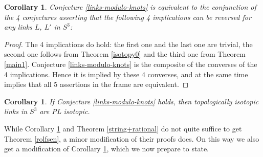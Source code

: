 \documentclass[a4paper,12pt,reqno,oneside]{amsart} %
\theoremstyle{plain}
\newtheorem{corollary}[theorem]{Corollary}
\theoremstyle{definition}
\theoremstyle{named}
\renewcommand{\:}{\colon}
\begin{document}
\begin{corollary} \label{main1'} Conjecture \ref{links-modulo-knots} is equivalent to the conjunction of the 4 conjectures 
asserting that the following 4 implications can be reversed for any links $L$, $L'$ in $S^3$:
\bigskip

\noindent{}
\end{corollary}

\begin{proof} The 4 implications do hold: the first one and the last one are trivial, the second one follows from 
Theorem \ref{isotopy0} and the third one from Theorem \ref{main1}.
Conjecture \ref{links-modulo-knots} is the composite of the converses of the 4 implications.
Hence it is implied by these 4 converses, and at the same time implies that all 5 assertions in the frame are equivalent.
\end{proof}

\begin{corollary} \label{old}
If Conjecture \ref{links-modulo-knots} holds, then topologically isotopic links in $S^3$ are PL isotopic.
\end{corollary}

While Corollary \ref{old} and Theorem \ref{string+rational} do not quite suffice to get Theorem \ref{rolfsen}, 
a minor modification of their proofs does.
On this way we also get a modification of Corollary \ref{main1'}, which we now prepare to state.
\end{document}
